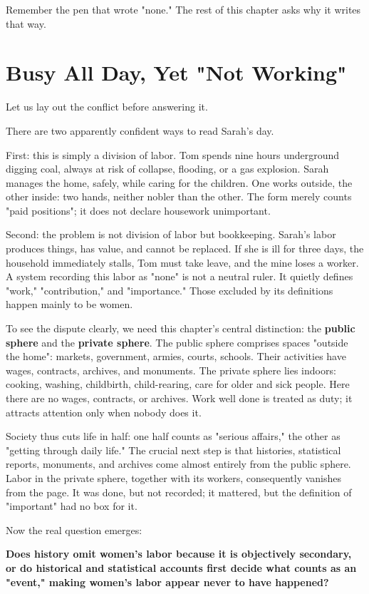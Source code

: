 Remember the pen that wrote "none." The rest of this chapter asks why it writes that way.

\section{Busy All Day, Yet "Not Working"}
Let us lay out the conflict before answering it.

There are two apparently confident ways to read Sarah's day.

First: this is simply a division of labor. Tom spends nine hours underground digging coal, always at risk of collapse, flooding, or a gas explosion. Sarah manages the home, safely, while caring for the children. One works outside, the other inside: two hands, neither nobler than the other. The form merely counts "paid positions"; it does not declare housework unimportant.

Second: the problem is not division of labor but bookkeeping. Sarah's labor produces things, has value, and cannot be replaced. If she is ill for three days, the household immediately stalls, Tom must take leave, and the mine loses a worker. A system recording this labor as "none" is not a neutral ruler. It quietly defines "work," "contribution," and "importance." Those excluded by its definitions happen mainly to be women.

To see the dispute clearly, we need this chapter's central distinction: the \textbf{public sphere} and the \textbf{private sphere}. The public sphere comprises spaces "outside the home": markets, government, armies, courts, schools. Their activities have wages, contracts, archives, and monuments. The private sphere lies indoors: cooking, washing, childbirth, child-rearing, care for older and sick people. Here there are no wages, contracts, or archives. Work well done is treated as duty; it attracts attention only when nobody does it.

Society thus cuts life in half: one half counts as "serious affairs," the other as "getting through daily life." The crucial next step is that histories, statistical reports, monuments, and archives come almost entirely from the public sphere. Labor in the private sphere, together with its workers, consequently vanishes from the page. It was done, but not recorded; it mattered, but the definition of "important" had no box for it.

Now the real question emerges:

\textbf{Does history omit women's labor because it is objectively secondary, or do historical and statistical accounts first decide what counts as an "event," making women's labor appear never to have happened?}

